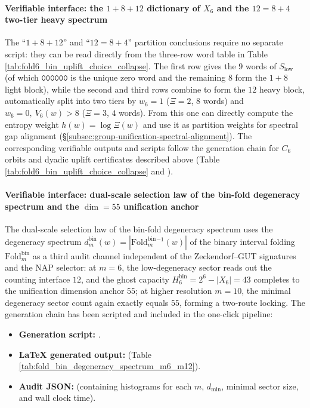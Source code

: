 \paragraph{Verifiable interface: the \(1+8+12\) dictionary of \texorpdfstring{$X_6$}{X6} and the \(12=8+4\) two-tier heavy spectrum}
The ``\(1+8+12\)'' and ``\(12=8+4\)'' partition conclusions require no separate script:
they can be read directly from the three-row word table in Table \ref{tab:fold6_bin_uplift_choice_collapse}.
The first row gives the \(9\) words of \(S_{\mathrm{low}}\) (of which \(\texttt{000000}\) is the unique zero word and the remaining \(8\) form the \(1+8\) light block),
while the second and third rows combine to form the \(12\) heavy block, automatically split into two tiers by \(w_6=1\) (\(\Xi=2\), \(8\) words) and \(w_6=0,\ V_6(w)>8\) (\(\Xi=3\), \(4\) words).
From this one can directly compute the entropy weight \(h(w)=\log\Xi(w)\) and use it as partition weights for spectral gap alignment (\S\ref{subsec:group-unification-spectral-alignment}).
The corresponding verifiable outputs and scripts follow the generation chain for \(C_6\) orbits and dyadic uplift certificates described above (Table \ref{tab:fold6_bin_uplift_choice_collapse} and
\texttt{}).

\paragraph{Verifiable interface: dual-scale selection law of the bin-fold degeneracy spectrum and the \texorpdfstring{$\dim=55$}{dim=55} unification anchor}
The dual-scale selection law of the bin-fold degeneracy spectrum uses the degeneracy spectrum
\(
d^{\mathrm{bin}}_m(w)=|\mathrm{Fold}^{\mathrm{bin}}_m{}^{-1}(w)|
\)
of the binary interval folding \(\mathrm{Fold}^{\mathrm{bin}}_m\)
as a third audit channel independent of the Zeckendorf--GUT signatures and the NAP selector:
at \(m=6\), the low-degeneracy sector reads out the counting interface \(12\), and the ghost capacity \(H^{\mathrm{bin}}_6=2^6-|X_6|=43\) completes to the unification dimension anchor \(55\);
at higher resolution \(m=10\), the minimal degeneracy sector count again exactly equals \(55\), forming a two-route locking.
The generation chain has been scripted and included in the one-click pipeline:
\begin{itemize}
  \item \textbf{Generation script:} \texttt{}.
  \item \textbf{LaTeX generated output:} \texttt{} (Table \ref{tab:fold_bin_degeneracy_spectrum_m6_m12}).
  \item \textbf{Audit JSON:} \texttt{} (containing histograms for each \(m\), \(d_{\min}\), minimal sector size, and wall clock time).
\end{itemize}

